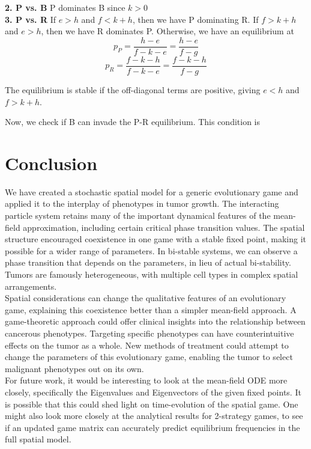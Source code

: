 \documentclass[12pt]{report}
\begin{document}
\textbf{2. P vs. B} P dominates B since $k > 0$ \\

\textbf{3. P vs. R} If $e > h$ and $f < k + h$, then we have P dominating R.
If $f > k + h$ and $ e > h$, then we have R dominates P. Otherwise, we have an equilibrium at 
$$p_{P} = \frac{h - e}{f - k - e} = \frac{h - e}{f - g}$$
$$p_{R} = \frac{f - k - h}{f - k - e}  = \frac{f - k - h}{f - g}$$ 

The equilibrium is stable if the off-diagonal terms are positive, giving $e < h$ and $f > k + h$. 

Now, we check if B can invade the P-R equilibrium. This condition is



\chapter*{Conclusion}
We have created a stochastic spatial model for a generic evolutionary game and applied it to the interplay of phenotypes in tumor growth. The interacting particle system retains many of the important dynamical features of the mean-field approximation, including certain critical phase transition values. The spatial structure encouraged coexistence in one game with a stable fixed point, making it possible for a wider range of parameters. In bi-stable systems, we can observe a phase transition that depends on the parameters, in lieu of actual bi-stability. Tumors are famously heterogeneous, with multiple cell types in complex spatial arrangements. \\

Spatial considerations can change the qualitative features of an evolutionary game, explaining this coexistence better than a simpler mean-field approach. A game-theoretic approach could offer clinical insights into the relationship between cancerous phenotypes. Targeting specific phenotypes can have counterintuitive effects on the tumor as a whole. New methods of treatment could attempt to change the parameters of this evolutionary game, enabling the tumor to select malignant phenotypes out on its own.\\

For future work, it would be interesting to look at the mean-field ODE more closely, specifically the Eigenvalues and Eigenvectors of the given fixed points. It is possible that this could shed light on time-evolution of the spatial game. One might also look more closely at the analytical results for 2-strategy games, to see if an updated game matrix can accurately predict equilibrium frequencies in the full spatial model. 



\newpage 

\end{document}
